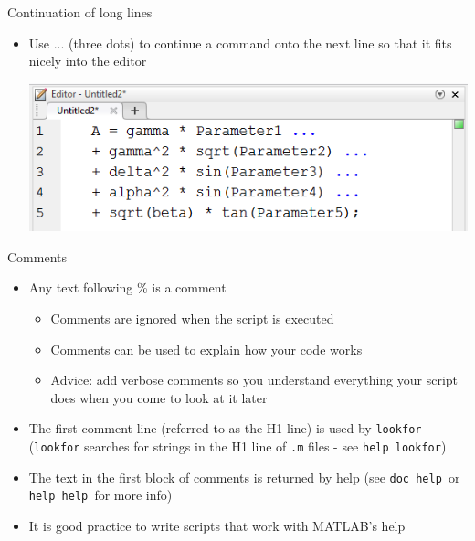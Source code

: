 \documentclass{beamer}
\begin{document}
\begin{frame}{Continuation of long lines}
	\begin{itemize}
		\item Use ... (three dots) to continue a command onto the next line so that it fits nicely into the editor
		
		
		\includegraphics[scale=0.7]{editor_line_continuation}
	\end{itemize}
\end{frame}

\begin{frame}{Comments}
	\begin{itemize}
		\item Any text following \% is a comment
		\begin{itemize}
			\item Comments are ignored when the script is executed
			\item Comments can be used to explain how your code works
			\item Advice: add verbose comments so you understand everything your script does when you come to look at it later
		\end{itemize}
		\item The first comment line (referred to as the H1 line) is used by \texttt{lookfor} (\texttt{lookfor} searches for strings in the H1 line of \texttt{.m} files - see \texttt{help lookfor})
		\item The text in the first block of comments is returned by help (see \texttt{doc help }or \texttt{help help }for more info)
		\item It is good practice to write scripts that work with MATLAB’s help
		
		
	\end{itemize}
\end{frame}
\end{document}
